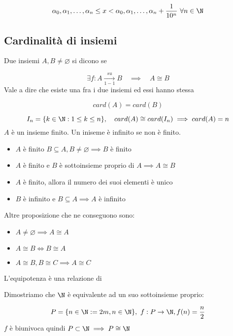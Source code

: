 \documentclass[../analisi.tex]{subfiles}
\begin{document}
\begin{equation}
	\alpha_0, \alpha_1, \dots, \alpha_n \leq x < 
	\alpha_0, \alpha_1, \dots, \alpha_n + \frac{1}{10^n}\ \forall n \in \N
\end{equation}

\subsection{Cardinalità di insiemi}
Due insiemi $ A, B \neq \varnothing $ si dicono  se 

\begin{equation}
	\exists f: A \underset{1 - 1}{\overset{su}{\to}} B \quad
	\implies \quad A \cong B
\end{equation}
Vale a dire che esiste una  fra i due insiemi ed essi hanno stessa

\begin{equation}
	card(A)=card(B)
\end{equation}
\bda

\begin{equation}
	I_n = \{ k \in \N : 1 \leq k \leq n \}, \quad card(A) \cong card(I_n)
	\implies card(A) = n
\end{equation}
$A$ è un insieme finito. Un iniseme è infinito se non è finito. 

\begin{itemize}
	\item $A$ è finito $ B \subseteq A, B \neq \varnothing \implies B$ è finito
	\item $A$ è finito e $B$ è sottoinsieme proprio di $A \implies A \cong B$
	\item $A$ è finito, allora il numero dei suoi elementi è unico
	\item $B$ è infinito e $ B \subseteq A \implies A$ è infinito
\end{itemize}
Altre proposizione che ne conseguono sono:

\begin{itemize} 
	\item $A \neq \varnothing \implies A \cong A$
	\item $A \cong B \iff B \cong A$
	\item $ A \cong B, B \cong C \implies A \cong C$
\end{itemize}
L'equipotenza è una relazione di 

\begin{defn}[ $ \N $ è infinito]
Dimostriamo che $ \N $ è equivalente ad un suo sottoinsieme proprio: 

\begin{equation} 
	P = \{ n \in \N : = 2m, n \in \N \}, \
	f: P \to \N, f(n) = \frac{n}{2}
\end{equation}
$f$ è biunivoca quindi $ P \subset \N \implies P \cong \N $ 
\end{defn}
\end{document}
